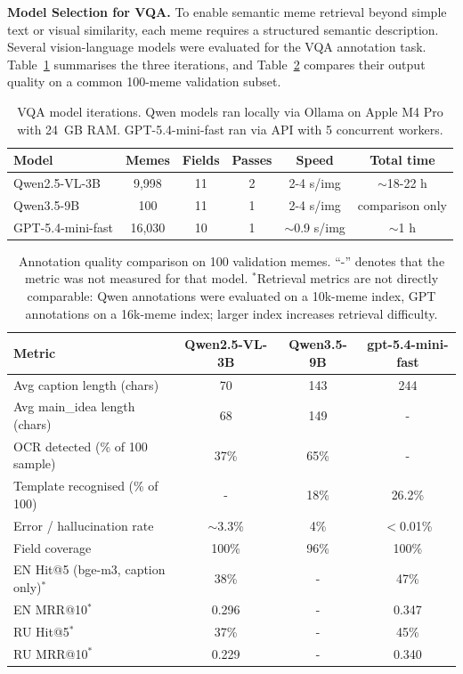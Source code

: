 \documentclass[a4paper,12pt]{article}
\begin{document}
\textbf{Model Selection for VQA.} To enable semantic meme retrieval beyond simple text or visual similarity, each meme requires a structured semantic description. Several vision-language models were evaluated for the VQA annotation task. Table~\ref{tab:vqa_models} summarises the three iterations, and Table~\ref{tab:vqa_quality} compares their output quality on a common 100-meme validation subset.

\begin{table}[H]
\centering
\caption{VQA model iterations. Qwen models ran locally via Ollama on Apple M4 Pro with 24~GB RAM. GPT-5.4-mini-fast ran via API with 5 concurrent workers.}
\label{tab:vqa_models}
\small
\begin{tabular}{|l|c|c|c|c|c|}
\hline
\textbf{Model} & \textbf{Memes} & \textbf{Fields} & \textbf{Passes} & \textbf{Speed} & \textbf{Total time} \\
\hline
Qwen2.5-VL-3B & 9,998 & 11 & 2 & 2-4 s/img & $\sim$18-22 h \\
\hline
Qwen3.5-9B & 100 & 11 & 1 & 2-4 s/img & comparison only \\
\hline
GPT-5.4-mini-fast & 16,030 & 10 & 1 & $\sim$0.9 s/img & $\sim$1 h \\
\hline
\end{tabular}
\end{table}

\begin{table}[H]
\centering
\caption{Annotation quality comparison on 100 validation memes. ``-'' denotes that the metric was not measured for that model. $^*$Retrieval metrics are not directly comparable: Qwen annotations were evaluated on a 10k-meme index, GPT annotations on a 16k-meme index; larger index increases retrieval difficulty.}
\label{tab:vqa_quality}
\small
\begin{tabular}{|l|c|c|c|}
\hline
\textbf{Metric} & \textbf{Qwen2.5-VL-3B} & \textbf{Qwen3.5-9B} & \textbf{gpt-5.4-mini-fast} \\
\hline
Avg caption length (chars) & 70 & 143 & 244 \\
\hline
Avg main\_idea length (chars) & 68 & 149 & - \\
\hline
OCR detected (\% of 100 sample) & 37\% & 65\% & - \\
\hline
Template recognised (\% of 100) & - & 18\% & 26.2\% \\
\hline
Error / hallucination rate & $\sim$3.3\% & 4\% & $<$0.01\% \\
\hline
Field coverage & 100\% & 96\% & 100\% \\
\hline
\hline
EN Hit@5 (bge-m3, caption only)$^*$ & 38\% & - & 47\% \\
\hline
EN MRR@10$^*$ & 0.296 & - & 0.347 \\
\hline
RU Hit@5$^*$ & 37\% & - & 45\% \\
\hline
RU MRR@10$^*$ & 0.229 & - & 0.340 \\
\hline
\end{tabular}
\end{table}
\end{document}
